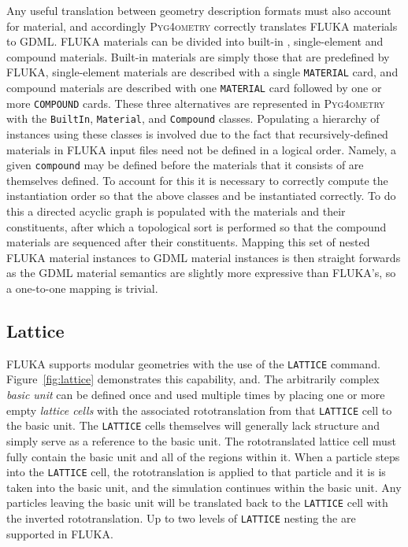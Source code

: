 \documentclass[final,5p,times,twocolumn]{elsarticle}
\newcommand{\pyinline}[1]{\lstinline[postbreak={}]{#1}}
\newcommand{\fluka}[1]{\texttt{\MakeUppercase{#1}}}
\newcommand{\PYGEOMETRY}{\textsc{Pyg4ometry}}
\begin{document}
Any useful translation between geometry description formats must also
account for material, and accordingly \PYGEOMETRY{} correctly translates
FLUKA materials to GDML.  FLUKA materials can be divided into built-in ,
single-element and compound materials.  Built-in materials are simply those
that are predefined by FLUKA, single-element materials are described with a
single \fluka{material} card, and compound materials are described with one
\fluka{material} card followed by one or more \fluka{compound} cards.
These three alternatives are represented in \PYGEOMETRY{} with the
\pyinline{BuiltIn}, \pyinline{Material}, and \pyinline{Compound} classes.
Populating a hierarchy of instances using these classes is involved due to
the fact that recursively-defined materials in FLUKA input files need not
be defined in a logical order.  Namely, a given \pyinline{compound} may be
defined before the materials that it consists of are themselves defined.
To account for this it is necessary to correctly compute the instantiation
order so that the above classes and be instantiated correctly.  To do this
a directed acyclic graph is populated with the materials and their
constituents, after which a topological sort is performed so that the
compound materials are sequenced after their constituents.  Mapping this
set of nested FLUKA material instances to GDML material instances is then
straight forwards as the GDML material semantics are slightly more
expressive than FLUKA's, so a one-to-one mapping is trivial.


\subsection{Lattice}

FLUKA supports modular geometries with the use of the \fluka{lattice}
command. Figure~\ref{fig:lattice} demonstrates this capability, and. The
arbitrarily complex \textit{basic unit} can be defined once and used
multiple times by placing one or more empty \textit{lattice cells} with the
associated rototranslation from that \fluka{lattice} cell to the basic
unit. The \fluka{lattice} cells themselves will generally lack structure
and simply serve as a reference to the basic unit. The rototranslated
lattice cell must fully contain the basic unit and all of the regions
within it. When a particle steps into the \fluka{lattice} cell, the
rototranslation is applied to that particle and it is is taken into the
basic unit, and the simulation continues within the basic unit. Any
particles leaving the basic unit will be translated back to the
\fluka{lattice} cell with the inverted rototranslation. Up to two
levels of \fluka{lattice} nesting the are supported in FLUKA.
\end{document}
